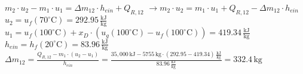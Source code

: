 \( m_2 \cdot u_2 - m_1 \cdot u_1 = \Delta m_{12} \cdot h_{ein} + Q_{R,12} \)  
\( \rightarrow m_2 \cdot u_2 = m_1 \cdot u_1 + Q_{R,12} - \Delta m_{12} \cdot h_{ein} \)  
\( u_2 = u_f(70^\circ \text{C}) = 292.95 \, \frac{\text{kJ}}{\text{kg}} \)  
\( u_1 = u_f(100^\circ \text{C}) + x_D \cdot (u_g(100^\circ \text{C}) - u_f(100^\circ \text{C})) = 419.34 \, \frac{\text{kJ}}{\text{kg}} \)  
\( h_{ein} = h_f(20^\circ \text{C}) = 83.96 \, \frac{\text{kJ}}{\text{kg}} \)  
\( \Delta m_{12} = \frac{Q_{R,12} - m_1 \cdot (u_2 - u_1)}{h_{ein}} = \frac{35,000 \, \text{kJ} - 5755 \, \text{kg} \cdot (292.95 - 419.34) \, \frac{\text{kJ}}{\text{kg}}}{83.96 \, \frac{\text{kJ}}{\text{kg}}} = 332.4 \, \text{kg} \)